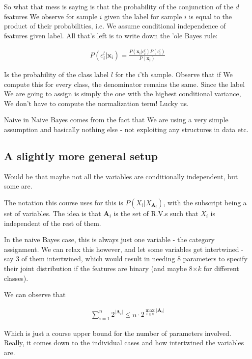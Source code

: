 \documentclass{article}
\begin{document}
		So what that mess is saying is that the probability of the conjunction of the $d$ features We observe for sample $i$ given the label for sample $i$ is equal to the product of their probabilities, i.e. We assume conditional independence of features given label. All that's left is to write down the 'ole Bayes rule:
		
		\begin{align}
			P(c^l_i | \mathbf{x}_i) = \frac{P(\mathbf{x}_i | c^l_i)P(c^l_i)}{P(\mathbf{x}_i)}
		\end{align}
		
		Is the probability of the class label $l$ for the $i$'th sample. Observe that if We compute this for every class, the denominator remains the same. Since the label We are going to assign is simply the one with the highest conditional variance, We don't have to compute the normalization term! Lucky us. 
		
		Naive in Naive Bayes comes from the fact that We are using a very simple assumption and basically nothing else - not exploiting any structures in data etc.
		
	\subsection{A slightly more general setup}
	
		 Would be that maybe not all the variables are conditionally independent, but some are. 
		 
		 The notation this course uses for this is $P(X_i|X_{\mathbf{A}_i})$, with the subscript being a set of variables. The idea is that $\mathbf{A}_i$ is the set of R.V.s such that $X_i$ is independent of the rest of them. 
		 
		 In the naive Bayes case, this is always just one variable - the category assignment. We can relax this however, and let some variables get intertwined - say 3 of them intertwined, which would result in needing 8 parameters to specify their joint distribution if the features are binary (and maybe 8$\times k$ for different classes).
		 
		 We can observe that
		 
		 \begin{align}
		 	\sum^n_{i=1} 2^{|\mathbf{A}_i|} \le n\cdot 2^{\max_{i\in n} |\mathbf{A}_i|}		 
		 \end{align}
		 
		 Which is just a course upper bound for the number of parameters involved. Really, it comes down to the individual cases and how intertwined the variables are.
		 
\end{document}
